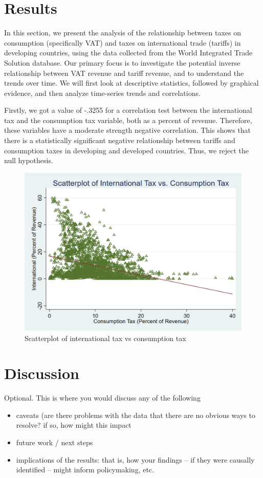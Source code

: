 \documentclass[12pt]{article}
\begin{document}
\section{Results}
\label{sec:result}

In this section, we present the analysis of the relationship between taxes on consumption (specifically VAT) and taxes on international trade (tariffs) in developing countries, using the data collected from the World Integrated Trade Solution database. Our primary focus is to investigate the potential inverse relationship between VAT revenue and tariff revenue, and to understand the trends over time. We will first look at descriptive statistics, followed by graphical evidence, and then analyze time-series trends and correlations. 

Firstly, we got a value of -.3255 for a correlation test between the international tax and the consumption tax variable, both as a percent of revenue. Therefore, these variables have a moderate strength negative correlation. This shows that there is a statistically significant negative relationship between tariffs and consumption taxes in developing and developed countries. Thus, we reject the null hypothesis.



\begin{figure}
    \centering
    \includegraphics[width=0.5\linewidth]{Reproducibility_Package//png_files/Scatterplotintvscons.png}
    \caption{Scatterplot of international tax vs consumption tax}
    \label{fig:enter-label}
\end{figure}

\section{Discussion}
\label{sec:discussion}

Optional. This is where you would discuss any of the following
\begin{itemize}
    \item caveats (are there problems with the data that there are no obvious ways to resolve? if so, how might this impact
    \item future work / next steps
    \item implications of the results: that is, how your findings -- if they were causally identified -- might inform policymaking, etc.
\end{itemize}
\end{document}
